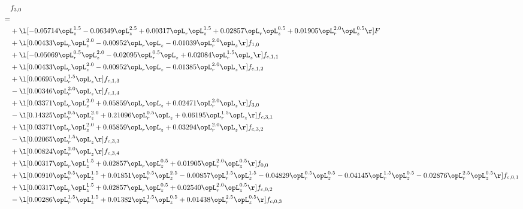 \begin{alignat}{2} 
\label{eq:f_30_1} 
& f_{3,0} \nonumber \\ 
 = \\ 
& + \l[  -0.05714 \opL_z^{1.5}   -0.06349 \opL_z^{2.5} +  0.00317 \opL_r \opL_z^{1.5} +  0.02857 \opL_r \opL_z^{0.5} +  0.01905 \opL_r^{2.0} \opL_z^{0.5}  \r] F \nonumber \\ 
& + \l[  0.00433 \opL_r \opL_z^{2.0}   -0.00952 \opL_r \opL_z   -0.01039 \opL_r^{2.0} \opL_z  \r] f_{1,0} \nonumber \\ 
& + \l[  -0.05069 \opL_r^{0.5} \opL_z^{2.0}   -0.02095 \opL_r^{0.5} \opL_z +  0.02084 \opL_r^{1.5} \opL_z  \r] f_{c,1,1} \nonumber \\ 
& + \l[  0.00433 \opL_r \opL_z^{2.0}   -0.00952 \opL_r \opL_z   -0.01385 \opL_r^{2.0} \opL_z  \r] f_{c,1,2} \nonumber \\ 
& + \l[  0.00695 \opL_r^{1.5} \opL_z  \r] f_{c,1,3} \nonumber \\ 
& - \l[  0.00346 \opL_r^{2.0} \opL_z  \r] f_{c,1,4} \nonumber \\ 
& + \l[  0.03371 \opL_r \opL_z^{2.0} +  0.05859 \opL_r \opL_z +  0.02471 \opL_r^{2.0} \opL_z  \r] f_{3,0} \nonumber \\ 
& - \l[  0.14325 \opL_r^{0.5} \opL_z^{2.0} +  0.21096 \opL_r^{0.5} \opL_z +  0.06195 \opL_r^{1.5} \opL_z  \r] f_{c,3,1} \nonumber \\ 
& + \l[  0.03371 \opL_r \opL_z^{2.0} +  0.05859 \opL_r \opL_z +  0.03294 \opL_r^{2.0} \opL_z  \r] f_{c,3,2} \nonumber \\ 
& - \l[  0.02065 \opL_r^{1.5} \opL_z  \r] f_{c,3,3} \nonumber \\ 
& + \l[  0.00824 \opL_r^{2.0} \opL_z  \r] f_{c,3,4} \nonumber \\ 
& + \l[  0.00317 \opL_r \opL_z^{1.5} +  0.02857 \opL_r \opL_z^{0.5} +  0.01905 \opL_r^{2.0} \opL_z^{0.5}  \r] f_{0,0} \nonumber \\ 
& + \l[  0.00910 \opL_r^{0.5} \opL_z^{1.5} +  0.01851 \opL_r^{0.5} \opL_z^{2.5}   -0.00857 \opL_r^{1.5} \opL_z^{1.5}   -0.04829 \opL_r^{0.5} \opL_z^{0.5}   -0.04145 \opL_r^{1.5} \opL_z^{0.5}   -0.02876 \opL_r^{2.5} \opL_z^{0.5}  \r] f_{c,0,1} \nonumber \\ 
& + \l[  0.00317 \opL_r \opL_z^{1.5} +  0.02857 \opL_r \opL_z^{0.5} +  0.02540 \opL_r^{2.0} \opL_z^{0.5}  \r] f_{c,0,2} \nonumber \\ 
& - \l[  0.00286 \opL_r^{1.5} \opL_z^{1.5} +  0.01382 \opL_r^{1.5} \opL_z^{0.5} +  0.01438 \opL_r^{2.5} \opL_z^{0.5}  \r] f_{c,0,3} \nonumber \\ 

\end{alignat}
